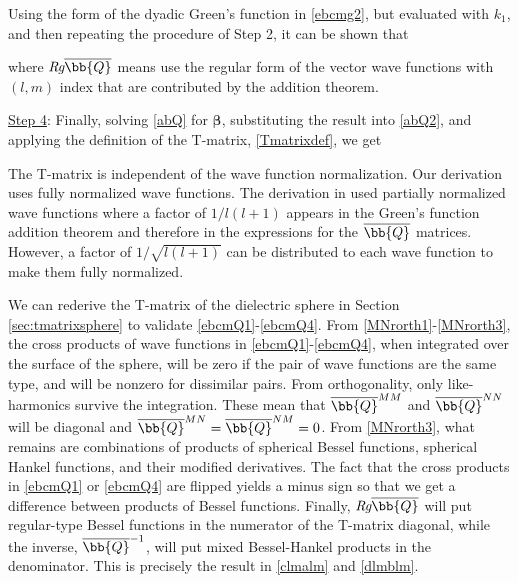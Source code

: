Using the form of the dyadic Green's function in \eqref{ebcmg2}, but evaluated with $k_1$, and then repeating the procedure of Step 2, it can be shown that 

\noindent where $\textit{Rg}\overline{\bb{Q}}$ means use the regular form of the vector wave functions with $(l,m)$ index that are contributed by the addition theorem. 

\underline{Step 4}: Finally, solving \eqref{abQ} for $\boldsymbol{\beta}$, substituting the result into \eqref{abQ2}, and applying the definition of the T-matrix, \eqref{Tmatrixdef}, we get  


The T-matrix is independent of the wave function normalization. Our derivation uses fully normalized wave functions. The derivation in \cite{duan2015experimental} used partially normalized wave functions where a factor of $1/l(l+1)$ appears in the Green's function addition theorem and therefore in the expressions for the $\overline{\bb{Q}}$ matrices. However, a factor of $1/\sqrt{l(l+1)}$ can be distributed to each wave function to make them fully normalized. %

We can rederive the T-matrix of the dielectric sphere in Section \ref{sec:tmatrixsphere} to validate \eqref{ebcmQ1}-\eqref{ebcmQ4}. From \eqref{MNrorth1}-\eqref{MNrorth3}, the cross products of wave functions in \eqref{ebcmQ1}-\eqref{ebcmQ4}, when integrated over the surface of the sphere, will be zero if the pair of wave functions are the same type, and will be nonzero for dissimilar pairs. From orthogonality, only like-harmonics survive the integration. These mean that $\overline{\bb{Q}}^{MM}$ and $\overline{\bb{Q}}^{NN}$ will be diagonal and $\overline{\bb{Q}}^{MN} = \overline{\bb{Q}}^{NM} = 0$. From \eqref{MNrorth3}, what remains are combinations of products of spherical Bessel functions, spherical Hankel functions, and their modified derivatives. The fact that the cross products in \eqref{ebcmQ1} or \eqref{ebcmQ4} are flipped yields a minus sign so that we get a difference between products of Bessel functions. Finally, $\textit{Rg}\overline{\bb{Q}}$ will put regular-type Bessel functions in the numerator of the T-matrix diagonal, while the inverse, $\overline{\bb{Q}}^{-1}$, will put mixed Bessel-Hankel products in the denominator. This is precisely the result in \eqref{clmalm} and \eqref{dlmblm}.  

